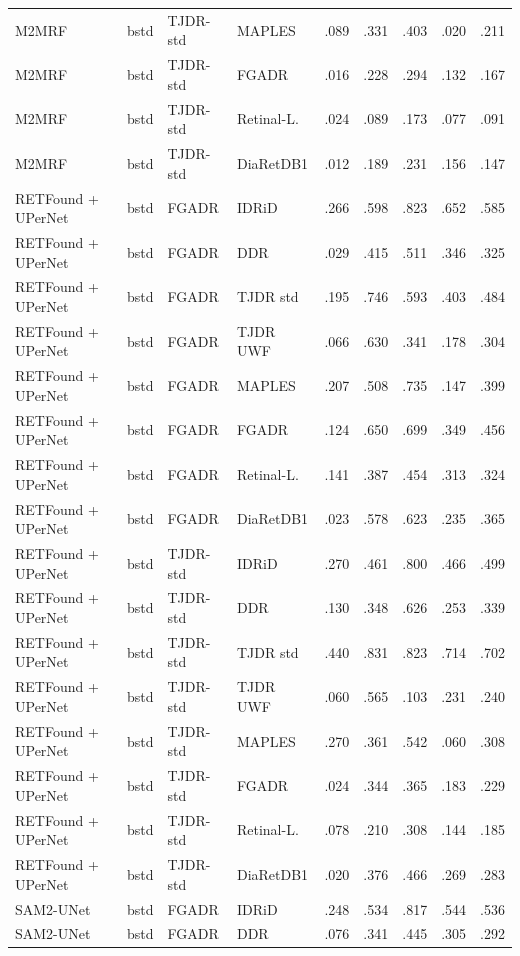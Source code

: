 \begin{landscape}
{\begin{longtable}{l l l l c c c c c}
M2MRF & bstd & TJDR-std & MAPLES & .089 & .331 & .403 & .020 & .211 \\
M2MRF & bstd & TJDR-std & FGADR & .016 & .228 & .294 & .132 & .167 \\
M2MRF & bstd & TJDR-std & Retinal-L. & .024 & .089 & .173 & .077 & .091 \\
M2MRF & bstd & TJDR-std & DiaRetDB1 & .012 & .189 & .231 & .156 & .147 \\
RETFound + UPerNet & bstd & FGADR & IDRiD & .266 & .598 & .823 & .652 & .585 \\
RETFound + UPerNet & bstd & FGADR & DDR & .029 & .415 & .511 & .346 & .325 \\
RETFound + UPerNet & bstd & FGADR & TJDR std & .195 & .746 & .593 & .403 & .484 \\
RETFound + UPerNet & bstd & FGADR & TJDR UWF & .066 & .630 & .341 & .178 & .304 \\
RETFound + UPerNet & bstd & FGADR & MAPLES & .207 & .508 & .735 & .147 & .399 \\
RETFound + UPerNet & bstd & FGADR & FGADR & .124 & .650 & .699 & .349 & .456 \\
RETFound + UPerNet & bstd & FGADR & Retinal-L. & .141 & .387 & .454 & .313 & .324 \\
RETFound + UPerNet & bstd & FGADR & DiaRetDB1 & .023 & .578 & .623 & .235 & .365 \\
RETFound + UPerNet & bstd & TJDR-std & IDRiD & .270 & .461 & .800 & .466 & .499 \\
RETFound + UPerNet & bstd & TJDR-std & DDR & .130 & .348 & .626 & .253 & .339 \\
RETFound + UPerNet & bstd & TJDR-std & TJDR std & .440 & .831 & .823 & .714 & .702 \\
RETFound + UPerNet & bstd & TJDR-std & TJDR UWF & .060 & .565 & .103 & .231 & .240 \\
RETFound + UPerNet & bstd & TJDR-std & MAPLES & .270 & .361 & .542 & .060 & .308 \\
RETFound + UPerNet & bstd & TJDR-std & FGADR & .024 & .344 & .365 & .183 & .229 \\
RETFound + UPerNet & bstd & TJDR-std & Retinal-L. & .078 & .210 & .308 & .144 & .185 \\
RETFound + UPerNet & bstd & TJDR-std & DiaRetDB1 & .020 & .376 & .466 & .269 & .283 \\
SAM2-UNet & bstd & FGADR & IDRiD & .248 & .534 & .817 & .544 & .536 \\
SAM2-UNet & bstd & FGADR & DDR & .076 & .341 & .445 & .305 & .292 \\

\end{longtable}}
\end{landscape}
